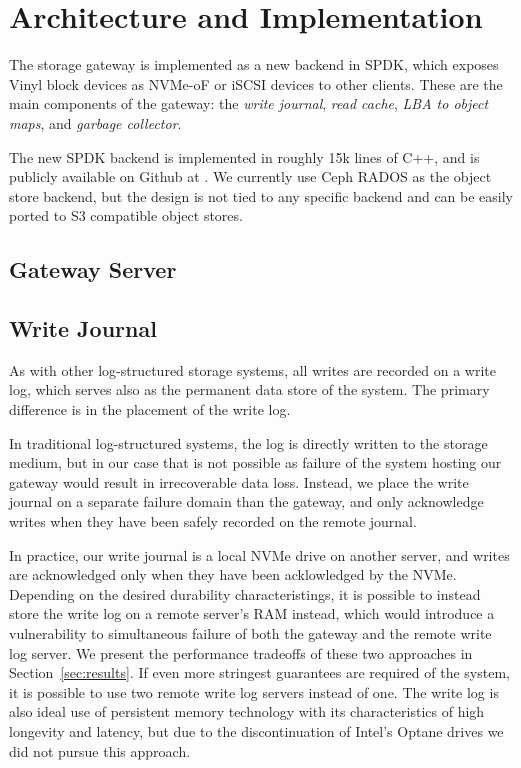 \section{Architecture and Implementation} \label{sec:architecture}

The storage gateway is implemented as a new backend in SPDK, which exposes
Vinyl block devices as NVMe-oF or iSCSI devices to other clients. These are the
main components of the gateway: the \textit{write journal}, \textit{read cache},
\textit{LBA to object maps}, and \textit{garbage collector}.

The new SPDK backend is implemented in roughly 15k lines of C++, and is publicly
available on Github at . We
currently use Ceph RADOS as the object store backend, but the design is not tied
to any specific backend and can be easily ported to S3 compatible object stores.

\subsection{Gateway Server}

\subsection{Write Journal}

As with other log-structured storage systems, all writes are recorded on a
write log, which serves also as the permanent data store of the system. The
primary difference is in the placement of the write log.

In traditional log-structured systems, the log is directly written to the
storage medium, but in our case that is not possible as failure of the system
hosting our gateway would result in irrecoverable data loss. Instead, we
place the write journal on a separate failure domain than the gateway, and only
acknowledge writes when they have been safely recorded on the remote journal.

In practice, our write journal is a local NVMe drive on another server, and
writes are acknowledged only when they have been acklowledged by the NVMe.
Depending on the desired durability characteristings, it is possible to instead
store the write log on a remote server's RAM instead, which would introduce a
vulnerability to simultaneous failure of both the gateway and the remote write
log server. We present the performance tradeoffs of these two approaches in
Section~\ref{sec:results}. If even more stringest guarantees are required of the
system, it is possible to use two remote write log servers instead of one. The
write log is also ideal use of persistent memory technology with its
characteristics of high longevity and latency, but due to the discontinuation of
Intel's Optane drives we did not pursue this approach.

